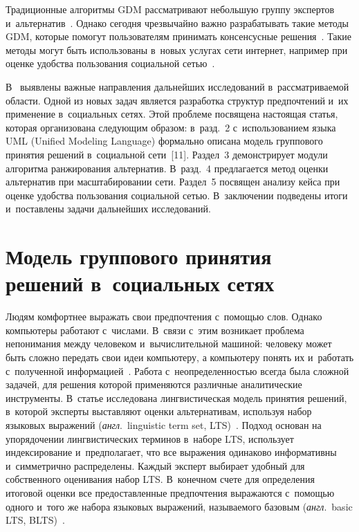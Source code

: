 \begin{multicols}{2}
  Традиционные алгоритмы GDM рассматривают небольшую группу 
экспертов и~альтернатив~\cite{5-gai}. Однако сегодня чрезвычайно важно 
разрабатывать такие методы GDM, которые помогут пользователям принимать 
консенсусные решения~\cite{4-gai, 9-gai, 10-gai}. Такие методы могут быть 
использованы в~новых услугах сети интернет, например при оценке удобства 
пользования социальной сетью~\cite{5-gai, 9-gai}. 
  
  В~\cite{4-gai} выявлены важные направления дальнейших исследований 
в~рассматриваемой области. Одной из новых задач является разработка 
структур предпочтений и~их применение в~социальных сетях. Этой проблеме 
посвящена настоящая статья, которая организована следующим образом: в~разд.~2
с~использованием языка UML (Unified Modeling Language) формально описана модель 
группового принятия решений в~социальной сети~[11]. Раздел~3 
демонстрирует модули алгоритма ранжирования альтернатив. В~разд.~4
предлагается метод оценки альтернатив при масштабировании сети. 
Раздел~5 посвящен анализу кейса при оценке удобства пользования 
социальной сетью. В~заключении подведены итоги и~поставлены задачи 
дальнейших исследований.

\section{Модель группового принятия решений в~социальных сетях}

  Людям комфортнее выражать свои предпочтения с~помощью слов. Однако 
компьютеры работают с~числами. В~связи с~этим возникает проблема 
непонимания между человеком и~вычислительной машиной: человеку может 
быть сложно передать свои идеи компьютеру, а компьютеру понять их 
и~работать с~полученной информацией~\cite{6-gai, 12-gai, 13-gai}. Работа 
с~неопределенностью всегда была сложной задачей, для решения которой 
применяются различные аналитические инструменты. В~статье исследована 
лингвистическая модель принятия решений, в~которой эксперты выставляют 
оценки альтернативам, используя набор языковых выражений (\textit{англ}.\ linguistic 
term set, LTS)~\cite{8-gai, 12-gai, 14-gai}. Подход основан на упорядочении 
лингвистических терминов в~наборе LTS, использует индексирование 
и~предполагает, что все выражения одинаково информативны и~симметрично 
распределены. Каждый эксперт выбирает удобный для собственного 
оценивания набор LTS. В~конечном счете для определения итоговой оценки 
все предоставленные предпочтения выражаются с~помощью одного и~того же 
набора языковых выражений, называемого базовым (\textit{англ}.\ basic LTS, 
BLTS)~\cite{5-gai, 12-gai}.
  

\end{multicols}
